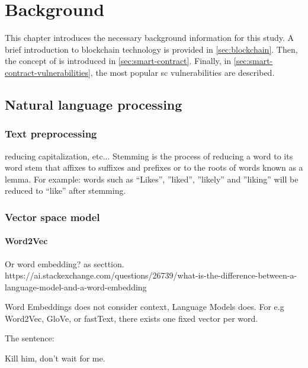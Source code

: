 \chapter{Background}
\label{chap:background}
This chapter introduces the necessary background information for this study. A brief introduction to blockchain technology is provided in \cref{sec:blockchain}. Then, the concept of  is introduced in \cref{sec:smart-contract}. Finally, in \cref{sec:smart-contract-vulnerabilities}, the most popular \acrshort{sc} vulnerabilities are described.


\section{Natural language processing}
\label{sec:natural-language-processing}

\subsection{Text preprocessing}
\label{sec:textt-preprocessing}
reducing capitalization, etc...
Stemming is the process of reducing a word to its word stem that affixes to suffixes and prefixes or to the roots of words known as a lemma. For example: words such as “Likes”, ”liked”, ”likely” and ”liking” will be reduced to “like” after stemming.

\subsection{Vector space model}
\label{sec:vector-space-model}

\subsubsection{Word2Vec}
\label{sec:vord2vec}
Or word embedding? as secttion.
https://ai.stackexchange.com/questions/26739/what-is-the-difference-between-a-language-model-and-a-word-embedding

Word Embeddings does not consider context, Language Models does.
For e.g Word2Vec, GloVe, or fastText, there exists one fixed vector per word.


The sentence:

Kill him, don't wait for me.

